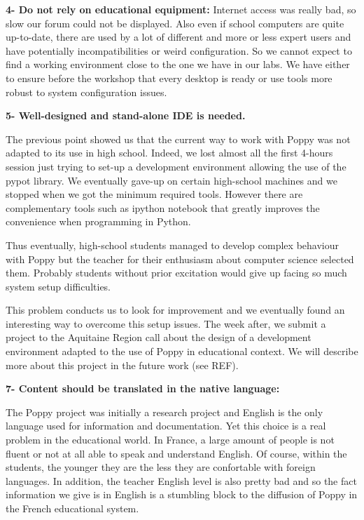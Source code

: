 \textbf{4- Do not rely on educational equipment:}
Internet access was really bad, so slow our forum could not be displayed. Also even if school computers are quite up-to-date, there are used by a lot of different and more or less expert users and have potentially incompatibilities or weird configuration. So we cannot expect to find a working environment close to the one we have in our labs.
We have either to ensure before the workshop that every desktop is ready or use tools more robust to system configuration issues.

\textbf{5- Well-designed and stand-alone IDE is needed.}

The previous point showed us that the current way to work with Poppy was not adapted to its use in high school. Indeed, we lost almost all the first 4-hours session just trying to set-up a development environment allowing the use of the pypot library. We eventually gave-up on certain high-school machines and we stopped when we got the minimum required tools. However there are complementary tools such as ipython notebook that greatly improves the convenience when programming in Python.

Thus eventually, high-school students managed to develop complex behaviour with Poppy but the teacher for their enthusiasm about computer science selected them. Probably students without prior excitation would give up facing so much system setup difficulties.

This problem conducts us to look for improvement and we eventually found an interesting way to overcome this setup issues. The week after, we submit a project to the Aquitaine Region call about the design of a development environment adapted to the use of Poppy in educational context. We will describe more about this project in the future work (see REF).


\textbf{7- Content should be translated in the native language:}

The Poppy project was initially a research project and English is the only language used for information and documentation. Yet this choice is a real problem in the educational world. In France, a large amount of people is not fluent or not at all able to speak and understand English. Of course, within the students, the younger they are the less they are confortable with foreign languages. In addition, the teacher English level is also pretty bad and so the fact information we give is in English is a stumbling block to the diffusion of Poppy in the French educational system.



